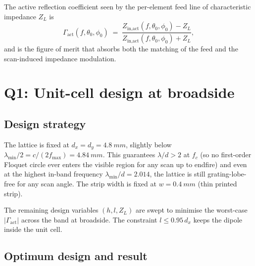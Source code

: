 \documentclass{article}
\begin{document}
The active reflection coefficient seen by the per-element feed line of characteristic impedance $Z_L$ is
\begin{equation}\label{eq:Gamma}
\Gamma_{\text{act}}(f,\theta_0,\phi_0) \;=\; \frac{Z_{\text{in,act}}(f,\theta_0,\phi_0) - Z_L}{Z_{\text{in,act}}(f,\theta_0,\phi_0) + Z_L},
\end{equation}
and is the figure of merit that absorbs both the matching of the feed and the scan-induced impedance modulation.

\section{Q1: Unit-cell design at broadside}

\subsection{Design strategy}

The lattice is fixed at $d_x = d_y = \SI{4.8}{mm}$, slightly below $\lambda_{\min}/2 = c/(2f_{\max}) = \SI{4.84}{mm}$. This guarantees $\lambda/d > 2$ at $f_c$ (so no first-order Floquet circle ever enters the visible region for any scan up to endfire) and even at the highest in-band frequency $\lambda_{\min}/d = 2.014$, the lattice is still grating-lobe-free for any scan angle. The strip width is fixed at $w = \SI{0.4}{mm}$ (thin printed strip).

The remaining design variables $(h, l, Z_L)$ are swept to minimise the worst-case $|\Gamma_{\text{act}}|$ across the band at broadside. The constraint $l \leq 0.95\,d_x$ keeps the dipole inside the unit cell.

\subsection{Optimum design and result}
\end{document}
